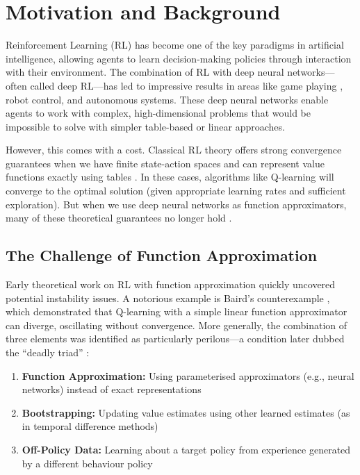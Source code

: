 \documentclass[12pt,a4paper]{report}
\begin{document}
\section{Motivation and Background}

Reinforcement Learning (RL) has become one of the key paradigms in artificial intelligence, allowing agents to learn decision-making policies through interaction with their environment. The combination of RL with deep neural networks—often called deep RL—has led to impressive results in areas like game playing \cite{mnih2015humanlevel}, robot control, and autonomous systems. These deep neural networks enable agents to work with complex, high-dimensional problems that would be impossible to solve with simpler table-based or linear approaches.

However, this comes with a cost. Classical RL theory offers strong convergence guarantees when we have finite state-action spaces and can represent value functions exactly using tables \cite{regehr2021elementary}. In these cases, algorithms like Q-learning will converge to the optimal solution (given appropriate learning rates and sufficient exploration). But when we use deep neural networks as function approximators, many of these theoretical guarantees no longer hold \cite{cayci2021sample}.

\subsection{The Challenge of Function Approximation}

Early theoretical work on RL with function approximation quickly uncovered potential instability issues. A notorious example is Baird's counterexample \cite{van2018deep}, which demonstrated that Q-learning with a simple linear function approximator can diverge, oscillating without convergence. More generally, the combination of three elements was identified as particularly perilous—a condition later dubbed the ``deadly triad'' \cite{van2018deep}:

\begin{enumerate}
    \item \textbf{Function Approximation:} Using parameterised approximators (e.g., neural networks) instead of exact representations
    \item \textbf{Bootstrapping:} Updating value estimates using other learned estimates (as in temporal difference methods)
    \item \textbf{Off-Policy Data:} Learning about a target policy from experience generated by a different behaviour policy
\end{enumerate}
\end{document}
